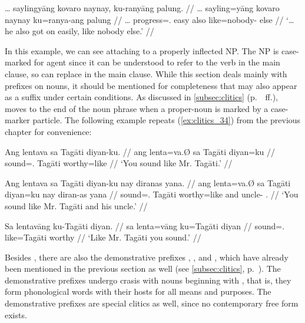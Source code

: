 \ex\label{ex:kukafka2}\begingl
	\gla … saylingyāng kovaro naynay, ku-ranyāng palung. //
	\glb … sayling=yāng kovaro naynay ku=ranya-ang palung //
	\glc … progress=\TsgM{}.\Aarg{} easy also like=nobody-\Aarg{} else //
	\glft `… he also got on easily, like nobody else.'%
	//
\endgl\xe

In this example, we can see  attaching to a properly inflected
NP. The NP  is case-marked for agent since it can be
understood to refer to the verb  in the main
clause, so  can replace
 in the main clause. While this section deals mainly
with prefixes on nouns, it should be mentioned for completeness that
 may also appear as a suffix under certain conditions. As
discussed in \autoref{subsec:clitics} (p.~\pageref{clitics_prenoun_ku}~ff.),
 moves to the end of the noun phrase when a proper-noun is
marked by a case-marker particle. The following example repeats
(\ref{ex:clitics_34}) from the previous chapter for convenience:

\pex
\a\begingl
	\gla Ang lentava sa Tagāti diyan-ku. //
	\glb ang lenta=va.Ø sa Tagāti diyan=ku //
	\glc \AgtT{} sound=\Second{}.\Top{} \Parg{} Tagāti worthy=like //
	\glft `You sound like Mr. Tagāti.' //
\endgl

\a\begingl
	\gla Ang lentava sa Tagāti diyan-ku nay diranas yana. //
	\glb ang lenta=va.Ø sa Tagāti diyan=ku nay diran-as yana //
	\glc \AgtT{} sound=\Second{}.\Top{} \Parg{} Tagāti worthy=like and 
		uncle-\Parg{} \TsgM{}.\Gen{} //
	\glft `You sound like Mr. Tagāti and his uncle.' //
\endgl

\a\begingl
	\gla Sa lentavāng ku-​Tagāti diyan. //
	\glb sa lenta=vāng ku=​Tagāti diyan //
	\glc \PatT{} sound=\Second{}.\Aarg{} like=​Tagāti worthy //
	\glft `Like Mr. Tagāti you sound.' //
\endgl
\xe

Besides , there are also the demonstrative prefixes
, , and ,
which have already been mentioned in the previous section as well (see
\autoref{subsec:clitics}, p.~\pageref{clitics_prenoun_dem}). The demonstrative
prefixes undergo crasis with nouns beginning with , that is, they form
phonological words with their hosts for all means and purposes. The
demonstrative prefixes are special clitics as well, since no contemporary free
form exists.

